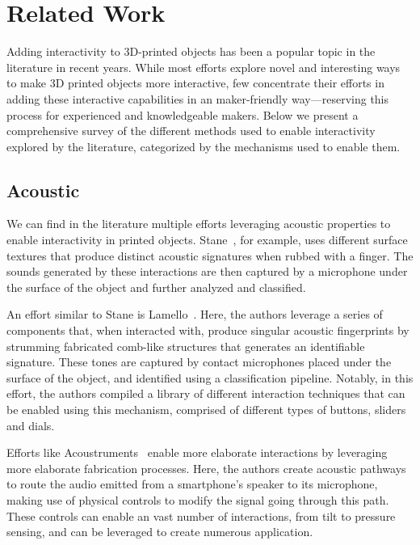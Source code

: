   \section{Related Work}
    \label{sec:related-work}
    Adding interactivity to 3D-printed objects has been a popular topic in the
    literature in recent years. While most efforts explore novel and
    interesting ways to make 3D printed objects more interactive, few
    concentrate their efforts in adding these interactive capabilities in an
    maker-friendly way---reserving this process for experienced and
    knowledgeable makers. Below we present a comprehensive survey of the
    different methods used to enable interactivity explored by the
    literature, categorized by the mechanisms used to enable them.

    \subsection{Acoustic}
      We can find in the literature multiple efforts leveraging acoustic
      properties to enable interactivity in printed objects.
      Stane~\cite{MurraySmith:2008ch}, for example, uses different surface
      textures that produce distinct acoustic signatures when rubbed with a
      finger. The sounds generated by these interactions are then captured by a
      microphone under the surface of the object and further analyzed and classified.

      An effort similar to Stane is Lamello~\cite{Savage:2015cs}.
      Here, the authors leverage a series of components that, when interacted
      with, produce singular acoustic fingerprints by strumming fabricated
      comb-like structures that generates an identifiable signature. These
      tones are captured by contact microphones placed under the surface of the
      object, and identified using a classification pipeline. Notably, in this
      effort, the authors compiled a library of different interaction
      techniques that can be enabled using this mechanism, comprised of
      different types of buttons, sliders and dials.

      Efforts like Acoustruments~\cite{Laput:2015hn} enable more
      elaborate interactions by leveraging more elaborate fabrication
      processes. Here, the authors create acoustic pathways to route the audio
      emitted from a smartphone's speaker to its microphone, making use of
      physical controls to modify the signal going through this path. These
      controls can enable an vast number of interactions, from tilt to pressure
      sensing, and can be leveraged to create numerous application.

